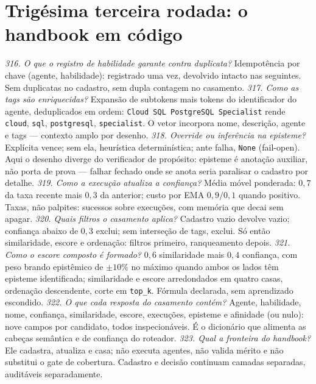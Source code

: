 \section{Trigésima terceira rodada: o handbook em código}
\textit{316. O que o registro de habilidade garante contra duplicata?} Idempotência por chave (agente, habilidade): registrado uma vez, devolvido intacto nas seguintes. Sem duplicatas no cadastro, sem dupla contagem no casamento.
\textit{317. Como as tags são enriquecidas?} Expansão de subtokens mais tokens do identificador do agente, deduplicados em ordem: \texttt{Cloud SQL PostgreSQL Specialist} rende \texttt{cloud}, \texttt{sql}, \texttt{postgresql}, \texttt{specialist}. O vetor incorpora nome, descrição, agente e tags --- contexto amplo por desenho.
\textit{318. Override ou inferência na episteme?} Explícita vence; sem ela, heurística determinística; ante falha, \texttt{None} (fail-open). Aqui o desenho diverge do verificador de propósito: episteme é anotação auxiliar, não porta de prova --- falhar fechado onde se anota seria paralisar o cadastro por detalhe.
\textit{319. Como a execução atualiza a confiança?} Média móvel ponderada: $0{,}7$ da taxa recente mais $0{,}3$ da anterior; custo por EMA $0{,}9/0{,}1$ quando positivo. Taxas, não palpites: sucessos sobre execuções, com memória que decai sem apagar.
\textit{320. Quais filtros o casamento aplica?} Cadastro vazio devolve vazio; confiança abaixo de $0{,}3$ exclui; sem interseção de tags, exclui. Só então similaridade, escore e ordenação: filtros primeiro, ranqueamento depois.
\textit{321. Como o escore composto é formado?} $0{,}6$ similaridade mais $0{,}4$ confiança, com peso brando epistêmico de $\pm10\%$ no máximo quando ambos os lados têm episteme identificada; similaridade e escore arredondados em quatro casas, ordenação descendente, corte em \texttt{top\_k}. Fórmula declarada, sem aprendizado escondido.
\textit{322. O que cada resposta do casamento contém?} Agente, habilidade, nome, confiança, similaridade, escore, execuções, episteme e afinidade (ou nulo): nove campos por candidato, todos inspecionáveis. É o dicionário que alimenta as cabeças semântica e de confiança do roteador.
\textit{323. Qual a fronteira do handbook?} Ele cadastra, atualiza e casa; não executa agentes, não valida mérito e não substitui o gate de cobertura. Cadastro e decisão continuam camadas separadas, auditáveis separadamente.
